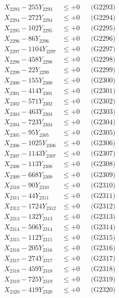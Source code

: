 \documentclass[a4paper,10pt]{article}
\begin{document}
{\begin{align}
X_{2293} - 255Y_{2293} &\leq +0 && \text{(G2293)} \\
X_{2294} - 272Y_{2294} &\leq +0 && \text{(G2294)} \\
X_{2295} - 102Y_{2295} &\leq +0 && \text{(G2295)} \\
X_{2296} - 86Y_{2296} &\leq +0 && \text{(G2296)} \\
X_{2297} - 1104Y_{2297} &\leq +0 && \text{(G2297)} \\
X_{2298} - 458Y_{2298} &\leq +0 && \text{(G2298)} \\
X_{2299} - 22Y_{2299} &\leq +0 && \text{(G2299)} \\
X_{2300} - 155Y_{2300} &\leq +0 && \text{(G2300)} \\
\allowbreak
X_{2301} - 414Y_{2301} &\leq +0 && \text{(G2301)} \\
X_{2302} - 571Y_{2302} &\leq +0 && \text{(G2302)} \\
X_{2303} - 463Y_{2303} &\leq +0 && \text{(G2303)} \\
X_{2304} - 723Y_{2304} &\leq +0 && \text{(G2304)} \\
X_{2305} - 95Y_{2305} &\leq +0 && \text{(G2305)} \\
X_{2306} - 1025Y_{2306} &\leq +0 && \text{(G2306)} \\
X_{2307} - 1143Y_{2307} &\leq +0 && \text{(G2307)} \\
X_{2308} - 113Y_{2308} &\leq +0 && \text{(G2308)} \\
X_{2309} - 668Y_{2309} &\leq +0 && \text{(G2309)} \\
X_{2310} - 90Y_{2310} &\leq +0 && \text{(G2310)} \\
\allowbreak
X_{2311} - 44Y_{2311} &\leq +0 && \text{(G2311)} \\
X_{2312} - 1724Y_{2312} &\leq +0 && \text{(G2312)} \\
X_{2313} - 132Y_{2313} &\leq +0 && \text{(G2313)} \\
X_{2314} - 506Y_{2314} &\leq +0 && \text{(G2314)} \\
X_{2315} - 112Y_{2315} &\leq +0 && \text{(G2315)} \\
X_{2316} - 205Y_{2316} &\leq +0 && \text{(G2316)} \\
X_{2317} - 274Y_{2317} &\leq +0 && \text{(G2317)} \\
X_{2318} - 459Y_{2318} &\leq +0 && \text{(G2318)} \\
X_{2319} - 725Y_{2319} &\leq +0 && \text{(G2319)} \\
X_{2320} - 419Y_{2320} &\leq +0 && \text{(G2320)} \\

\end{align}}
\end{document}
